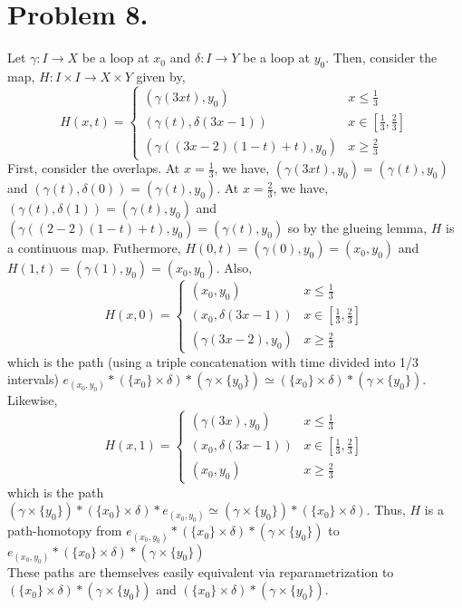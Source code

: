 \documentclass[12pt]{extarticle}
\begin{document}
\section*{Problem 8.}
Let $\gamma : I \to X$ be a loop at $x_0$ and $\delta : I \to Y$ be a loop at $y_0$. Then, consider the map, $H : I \times I \to X \times Y$ given by,
\[H(x, t) = \begin{cases}
(\gamma(3xt), y_0) & x \le \tfrac{1}{3} \\
(\gamma(t), \delta(3x - 1)) & x \in [\tfrac{1}{3}, \tfrac{2}{3}] \\ 
(\gamma((3x - 2)(1 - t) + t), y_0) & x \ge \tfrac{2}{3}
\end{cases}\]
First, consider the overlaps. At $x = \tfrac{1}{3}$, we have, $(\gamma(3xt), y_0) = (\gamma(t), y_0)$ and $(\gamma(t), \delta(0)) = (\gamma(t), y_0)$. At $x = \tfrac{2}{3}$, we have, $(\gamma(t), \delta(1)) = (\gamma(t), y_0)$ and $(\gamma((2 -2)(1 - t) + t), y_0) = (\gamma(t), y_0)$ so by the glueing lemma, $H$ is a continuous map. Futhermore, $H(0, t) = (\gamma(0), y_0) = (x_0, y_0)$ and $H(1, t) = (\gamma(1), y_0) = (x_0, y_0)$. Also,
\[H(x, 0) = \begin{cases}
(x_0, y_0) & x \le \tfrac{1}{3} \\
(x_0, \delta(3x - 1)) & x \in [\tfrac{1}{3}, \tfrac{2}{3}] \\ 
(\gamma(3x - 2), y_0) & x \ge \tfrac{2}{3}
\end{cases}\]
which is the path (using a triple concatenation with time divided into 1/3 intervals) $e_{(x_0, y_0)} * (\{x_0\} \times \delta) * (\gamma \times \{y_0\}) \simeq (\{x_0\} \times \delta) * (\gamma \times \{y_0\})$. Likewise,
\[H(x, 1) = \begin{cases}
(\gamma(3x), y_0) & x \le \tfrac{1}{3} \\
(x_0, \delta(3x - 1)) & x \in [\tfrac{1}{3}, \tfrac{2}{3}] \\ 
(x_0, y_0) & x \ge \tfrac{2}{3}
\end{cases}\]
which is the path $(\gamma \times \{y_0\}) * (\{x_0\} \times \delta) * e_{(x_0, y_0)} \simeq  (\gamma \times \{y_0\}) * (\{x_0\} \times \delta)$.
Thus, $H$ is a path-homotopy from $e_{(x_0, y_0)} * (\{x_0\} \times \delta) * (\gamma \times \{y_0\})$ to $e_{(x_0, y_0)} * (\{x_0\} \times \delta) * (\gamma \times \{y_0\}) $ \bigskip \\ These paths are themselves easily equivalent via reparametrization to $(\{x_0\} \times \delta) * (\gamma \times \{y_0\})$ and $(\{x_0\} \times \delta) * (\gamma \times \{y_0\})$. 
\end{document}
